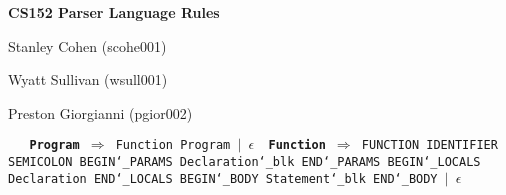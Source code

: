\documentclass{article}
\begin{document}
 
 
\centerline{\large \bf CS152 Parser Language Rules}
\centerline{Stanley Cohen (scohe001)}
\centerline{Wyatt Sullivan (wsull001)}
\centerline{Preston Giorgianni (pgior002)}

\texttt{
\
{\vskip 0.1in \noindent\bf Program} $\Rightarrow$ 
        Function Program $|$ $\epsilon$
{\vskip 0.1in \noindent\bf Function} $\Rightarrow$ 
        FUNCTION IDENTIFIER SEMICOLON BEGIN\char`_PARAMS Declaration\char`_blk 
        END\char`_PARAMS BEGIN\char`_LOCALS Declaration END\char`_LOCALS BEGIN\char`_BODY 
        Statement\char`_blk END\char`_BODY $|$ $\epsilon$
\
}
\end{document}
